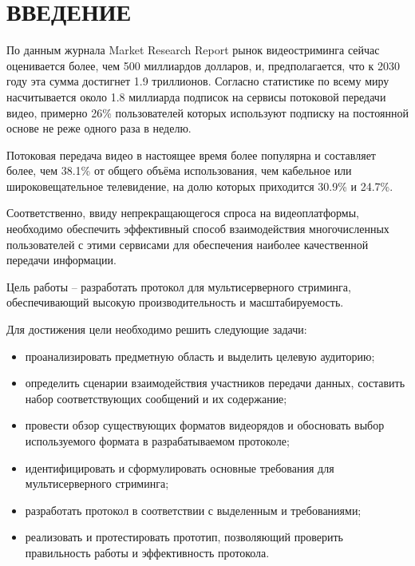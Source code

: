 \section*{ВВЕДЕНИЕ}
По данным журнала Market Research Report \cite{statistics} рынок видеостриминга сейчас оценивается более, чем 500 миллиардов долларов, и, предполагается, что к 2030 году эта сумма достигнет 1.9 триллионов. Согласно статистике по всему миру насчитывается около 1.8 миллиарда подписок на сервисы потоковой передачи видео, примерно 26\% пользователей которых используют подписку на постоянной основе не реже одного раза в неделю. 

Потоковая передача видео в настоящее время более популярна и составляет более, чем 38.1\% от общего объёма использования, чем кабельное или широковещательное телевидение, на долю которых приходится 30.9\% и 24.7\%.

Соответственно, ввиду непрекращающегося спроса на видеоплатформы, необходимо обеспечить эффективный способ взаимодействия многочисленных пользователей с этими сервисами для обеспечения наиболее качественной передачи информации.

Цель работы -- разработать протокол для мультисерверного стриминга, обеспечивающий высокую производительность и масштабируемость.

Для достижения цели необходимо решить следующие задачи:
\begin{itemize}	
	\item проанализировать предметную область и выделить целевую аудиторию;
	
	\item определить сценарии взаимодействия участников передачи данных, составить набор соответствующих сообщений и их содержание;
	
	\item провести обзор существующих форматов видеорядов и обосновать выбор используемого формата в разрабатываемом протоколе;
	
	\item идентифицировать и сформулировать основные требования для мультисерверного стриминга;
	
	\item разработать протокол в соответствии с выделенным и требованиями;
	
	\item реализовать и протестировать прототип, позволяющий проверить правильность работы и эффективность протокола.
\end{itemize}

\pagebreak